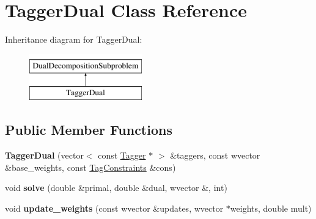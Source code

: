 \hypertarget{classTaggerDual}{
\section{TaggerDual Class Reference}
\label{classTaggerDual}
}
Inheritance diagram for TaggerDual:\begin{figure}[H]
\begin{center}
\leavevmode
\includegraphics[height=2cm]{classTaggerDual}
\end{center}
\end{figure}
\subsection*{Public Member Functions}
\begin{DoxyCompactItemize}
\item 
\hypertarget{classTaggerDual_a2b16f45c3550e4f4871841c9ee02de4f}{
{\bfseries TaggerDual} (vector$<$ const \hyperlink{classTagger}{Tagger} $\ast$ $>$ \&taggers, const wvector \&base\_\-weights, const \hyperlink{classTagConstraints}{TagConstraints} \&cons)}
\label{classTaggerDual_a2b16f45c3550e4f4871841c9ee02de4f}

\item 
\hypertarget{classTaggerDual_a047785058d058492172280e50a8f4c1a}{
void {\bfseries solve} (double \&primal, double \&dual, wvector \&, int)}
\label{classTaggerDual_a047785058d058492172280e50a8f4c1a}

\item 
\hypertarget{classTaggerDual_a01f7705a69c7cc993268c6e66df57ae0}{
void {\bfseries update\_\-weights} (const wvector \&updates, wvector $\ast$weights, double mult)}
\label{classTaggerDual_a01f7705a69c7cc993268c6e66df57ae0}

\end{DoxyCompactItemize}
